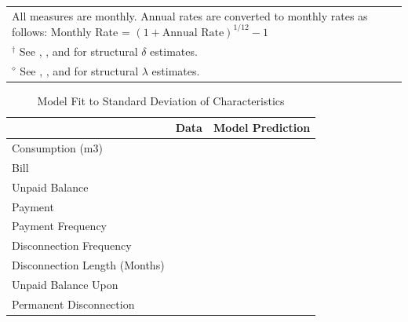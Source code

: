 \documentclass[12pt,table]{article}
\begin{document}
\begin{table}[H]
{\begin{tabular}{l*{1}{lll}}
\bottomrule
\multicolumn{4}{l}{\scriptsize All measures are monthly.  Annual rates are converted to monthly rates as follows: Monthly Rate = $(1+\text{Annual Rate})^{1/12}-1$} \\[-.5em]
\multicolumn{4}{l}{\scriptsize $\text{}^{\dagger}$ See \cite{andreoni2012estimating}, \cite{laibson2007estimating}, and \cite{gourinchas2002consumption} for structural $\delta$ estimates.} \\[-.5em]
\multicolumn{4}{l}{\scriptsize $\text{}^{\diamond}$ See \cite{barseghyan2013nature}, \cite{beetsma2001measuring}, and \cite{carvalho2016effect} for structural $\lambda$ estimates. }
\end{tabular}
}
\end{table}


\begin{table}[H]
\centering
\caption{Model Fit to Standard Deviation of Characteristics}\label{table:fitsd}
\begin{threeparttable}
\begin{tabular}{@{}l*{1}{KK}@{}}
\toprule
 & Data & Model Prediction \\
\midrule
Consumption (m3) &  &   \\
Bill &   &   \\
Unpaid Balance &    &    \\
Payment &   &   \\
Payment Frequency &   &    \\
Disconnection Frequency &    &   \\
Disconnection Length (Months) &  &   \\
Unpaid Balance Upon &   &    \\[-.5em]
Permanent Disconnection \\
\bottomrule
\end{tabular}
\begin{tablenotes}
\item 
\footnotesize
\end{tablenotes}
\end{threeparttable}

\end{table}
\end{document}

